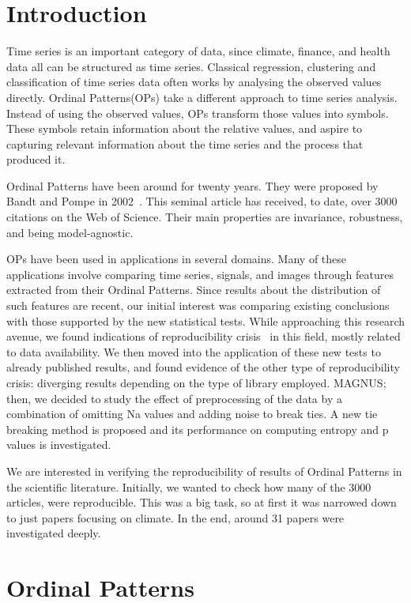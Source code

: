 
\chapter{Introduction}

Time series is an important category of data, since climate, finance, and health data all can be structured as time series. Classical regression, clustering and classification of time series data often works by analysing the observed values directly. Ordinal Patterns(OPs) take a different approach to time series analysis.
Instead of using the observed values, OPs transform those values into symbols.
These symbols retain information about the relative values, and aspire to capturing relevant information about the time series and the process that produced it.

Ordinal Patterns have been around for twenty years.
They were proposed by Bandt and Pompe in 2002~\cite{Bandt2002}.
This seminal article has received, to date, over \num{3000} citations on the Web of Science.
Their main properties are invariance, robustness, and being model-agnostic.

OPs have been used in applications in several domains.
Many of these applications involve comparing time series, signals, and images through features extracted from their Ordinal Patterns.
Since results about the distribution of such features are recent, our initial interest was comparing existing conclusions with those supported by the new statistical tests.
While approaching this research avenue, we found indications of reproducibility crisis~\cite{Fidler2018} in this field, mostly related to data availability.
We then moved into the application of these new tests to already published results, and found evidence of the other type of reproducibility crisis: diverging results depending on the type of library employed.
MAGNUS; then, we decided to study the effect of preprocessing of the data by a combination of omitting Na values and adding noise to break ties. A new tie breaking method is proposed and its performance on computing entropy and p values is investigated.

We are interested in verifying the reproducibility of results of Ordinal Patterns in the scientific literature.
Initially, we wanted to check how many of the 3000 articles, were reproducible. This was a big task, so at first it was narrowed down to just papers focusing on climate. In the end, around 31 papers were investigated deeply.

\chapter{Ordinal Patterns}


